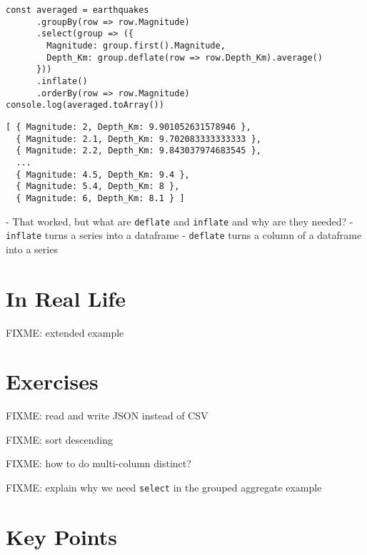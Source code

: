 \begin{verbatim}
const averaged = earthquakes
      .groupBy(row => row.Magnitude)
      .select(group => ({
        Magnitude: group.first().Magnitude,
        Depth_Km: group.deflate(row => row.Depth_Km).average()
      }))
      .inflate()
      .orderBy(row => row.Magnitude)
console.log(averaged.toArray())
\end{verbatim}

\begin{verbatim}
[ { Magnitude: 2, Depth_Km: 9.901052631578946 },
  { Magnitude: 2.1, Depth_Km: 9.702083333333333 },
  { Magnitude: 2.2, Depth_Km: 9.843037974683545 },
  ...
  { Magnitude: 4.5, Depth_Km: 9.4 },
  { Magnitude: 5.4, Depth_Km: 8 },
  { Magnitude: 6, Depth_Km: 8.1 } ]
\end{verbatim}

-   That worked, but what are \texttt{deflate} and \texttt{inflate} and why are they needed?
-   \texttt{inflate} turns a series into a dataframe
-   \texttt{deflate} turns a column of a dataframe into a series

\section{In Real Life}\label{s:dataforge-real}

FIXME: extended example

\section{Exercises}\label{s:dataforge-exercises}

FIXME: read and write JSON instead of CSV

FIXME: sort descending

FIXME: how to do multi-column distinct?

FIXME: explain why we need \texttt{select} in the grouped aggregate example

\section*{Key Points}


